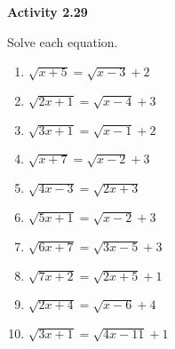 \vspace{1ex}
\noindent\textbf{Activity 2.29}

\vspace{0.75ex}

Solve each equation.

\begin{multicols}{2}
\begin{enumerate}[noitemsep, label = \color{blue}\arabic*. ]
    \item \( \sqrt{x + 5} = \sqrt{x - 3} + 2 \)
    \item \( \sqrt{2x + 1} = \sqrt{x - 4} + 3 \)
    \item \( \sqrt{3x + 1} = \sqrt{x - 1} + 2 \)
    \item \( \sqrt{x + 7} = \sqrt{x - 2} + 3 \)
    \item \( \sqrt{4x - 3} = \sqrt{2x + 3} \)
    \item \( \sqrt{5x + 1} = \sqrt{x - 2} + 3 \)
    \item \( \sqrt{6x + 7} = \sqrt{3x - 5} + 3 \)
    \item \( \sqrt{7x + 2} = \sqrt{2x + 5} + 1 \)
    \item \( \sqrt{2x + 4} = \sqrt{x - 6} + 4 \)
    \item \( \sqrt{3x + 1} = \sqrt{4x - 11} + 1 \)
\end{enumerate}
\end{multicols}

